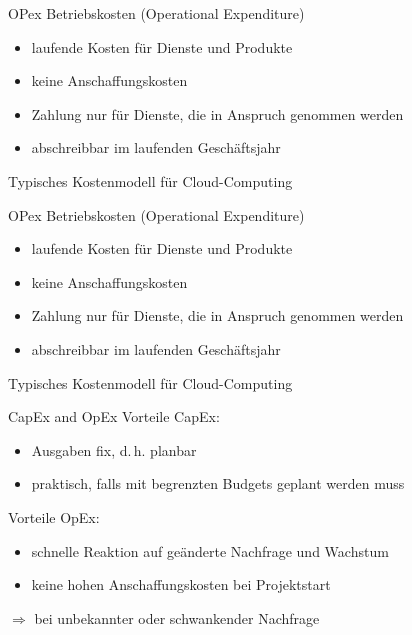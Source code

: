 \begin{flashcard}[Definition]{OPex}
    Betriebskosten (Operational Expenditure)
    \begin{itemize}
        \item laufende Kosten für Dienste und Produkte
        \item keine Anschaffungskosten
        \item Zahlung nur für Dienste, die in Anspruch genommen werden
        \item abschreibbar im laufenden Geschäftsjahr
    \end{itemize}

    Typisches Kostenmodell für Cloud-Computing
\end{flashcard}

\begin{flashcard}[Beispiel]{OPex}
    Betriebskosten (Operational Expenditure)
    \begin{itemize}
        \item laufende Kosten für Dienste und Produkte
        \item keine Anschaffungskosten
        \item Zahlung nur für Dienste, die in Anspruch genommen werden
        \item abschreibbar im laufenden Geschäftsjahr
    \end{itemize}

    Typisches Kostenmodell für Cloud-Computing
\end{flashcard}

\begin{flashcard}[Vergleiche]{CapEx and OpEx}
    Vorteile CapEx:
    \begin{itemize}
        \item Ausgaben fix, d.\,h. planbar
        \item praktisch, falls mit begrenzten Budgets geplant werden muss
    \end{itemize}

    Vorteile OpEx:
    \begin{itemize}
        \item schnelle Reaktion auf geänderte Nachfrage und Wachstum
        \item keine hohen Anschaffungskosten bei Projektstart
    \end{itemize}
    $\Rightarrow$ bei unbekannter oder schwankender Nachfrage

\end{flashcard}

